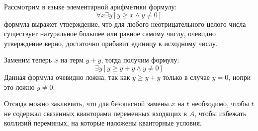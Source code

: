 \documentclass[a4paper,12pt]{article}
\begin{document}
\begin{Solution}
Рассмотрим в языке элементарной арифметики формулу:
\[
	\forall x \exists y \left[y \ge x \land y\not=0\right]
\]
формула выражет утверждение, что для любого неотрицательного целого числа существует натуральное большее или равное самому числу, очевидно утверждение верно, достаточно прибавит единицу к исходному числу.

Заменим теперь $x$ на терм $y+y$, тогда получим формулу:
\[
	\exists y \left[y \ge y+y \land y\not=0\right]
\]
Данная формула очевидно ложна, так как $y \ge y+y$ только в случае $y=0$, нопри это ложно $y\not=0$.

Отсюда можно заключить, что для безопасной замены $x$ на $t$ необходимо, чтобы $t$ не содержал связанных кванторами переменных входящих в $A$, чтобы избежать коллизий перемнных, на которые наложены кванторные условия.
\end{Solution}
\end{document}
